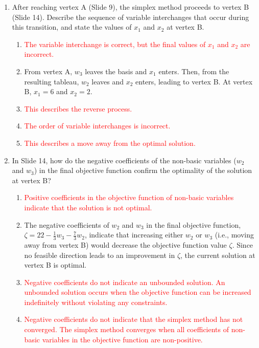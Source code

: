 \documentclass{article}%
\newcommand{\incorrect}[1]{\textcolor{red}{#1}}
\begin{document}
\begin{enumerate}
\begin{enumerate}
\begin{enumerate}
\end{enumerate}%
\vspace{0.5em}%
\item After reaching vertex A (Slide 9), the simplex method proceeds to vertex B (Slide 14). Describe the sequence of variable interchanges that occur during this transition, and state the values of $ x_1 $ and $ x_2 $ at vertex B.%
\begin{enumerate}%
\item \incorrect{The variable interchange is correct, but the final values of $ x_1 $ and $ x_2 $ are incorrect.}%
\item From vertex A, $ w_3 $ leaves the basis and $ x_1 $ enters.  Then, from the resulting tableau, $ w_2 $ leaves and $ x_2 $ enters, leading to vertex B. At vertex B, $ x_1 = 6 $ and $ x_2 = 2 $.%
\item \incorrect{This describes the reverse process.}%
\item \incorrect{The order of variable interchanges is incorrect.}%
\item \incorrect{This describes a move away from the optimal solution.}%
\end{enumerate}%
\vspace{0.5em}%
\item In Slide 14, how do the negative coefficients of the non-basic variables ($ w_2 $ and $ w_3 $) in the final objective function confirm the optimality of the solution at vertex B?%
\begin{enumerate}%
\item \incorrect{Positive coefficients in the objective function of non-basic variables indicate that the solution is not optimal.}%
\item The negative coefficients of $ w_2 $ and $ w_3 $ in the final objective function, $ \zeta = 22 - \frac{1}{3}w_3 - \frac{7}{3}w_2 $, indicate that increasing either $ w_2 $ or $ w_3 $ (i.e., moving away from vertex B) would decrease the objective function value $ \zeta $. Since no feasible direction leads to an improvement in $ \zeta $, the current solution at vertex B is optimal.%
\item \incorrect{Negative coefficients do not indicate an unbounded solution. An unbounded solution occurs when the objective function can be increased indefinitely without violating any constraints.}%
\item \incorrect{Negative coefficients do not indicate that the simplex method has not converged. The simplex method converges when all coefficients of non-basic variables in the objective function are non-positive.}%

\end{enumerate}
\end{enumerate}
\end{enumerate}
\end{document}
